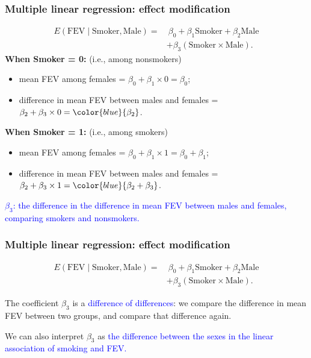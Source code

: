 \documentclass[12pt, 
hyperref={colorlinks=true, linkcolor=blue, urlcolor=cyan}]{beamer}
\begin{document}
\begin{frame}
\frametitle{Multiple linear regression: effect modification}
\vspace{-0.7cm}
\begin{align*}
E(\text{FEV} \mid \text{Smoker}, \text{Male}) = & \ \beta_0 + \beta_1 \text{Smoker} + \beta_2 \text{Male}\\
& + \beta_3 (\text{Smoker} \times \text{Male}).
\end{align*}
\vspace{-0.3cm}
\textbf{When Smoker = 0:}  (i.e., among nonsmokers) \vspace{-0.2cm}
\begin{itemize}
\item mean FEV among females = $\beta_0 + \beta_1 \times 0 = \beta_0$; 
\item difference in mean FEV between males and females = $\beta_2 + \beta_3 \times 0 = \color{blue}{\beta_2}$.
\end{itemize}

\textbf{When Smoker = 1:}  (i.e., among smokers) \vspace{-0.2cm}
\begin{itemize}
\item mean FEV among females = $\beta_0 + \beta_1 \times 1 = \beta_0 + \beta_1$; 
\item difference in mean FEV between males and females = $\beta_2 + \beta_3 \times 1 = \color{blue}{\beta_2 + \beta_3}$.
\end{itemize}

\textcolor{blue}{$\beta_3$: the difference in the difference in mean FEV between males and females, comparing smokers and nonsmokers.}
\end{frame}

\begin{frame}
\frametitle{Multiple linear regression: effect modification}
\begin{align*}
E(\text{FEV} \mid \text{Smoker}, \text{Male}) = & \ \beta_0 + \beta_1 \text{Smoker} + \beta_2 \text{Male}\\
& + \beta_3 (\text{Smoker} \times \text{Male}).
\end{align*}

The coefficient $\beta_3$ is a \textcolor{blue}{difference of differences}: we compare the difference in mean FEV between two groups, and compare that difference again.

We can also interpret $\beta_3$ as \textcolor{blue}{the difference between the sexes in the linear association of smoking and FEV.}

\end{frame}
\end{document}
